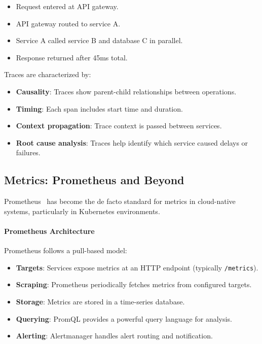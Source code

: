 \begin{itemize}
    \item Request entered at API gateway.
    \item API gateway routed to service A.
    \item Service A called service B and database C in parallel.
    \item Response returned after 45ms total.
\end{itemize}

Traces are characterized by:
\begin{itemize}
    \item \textbf{Causality}: Traces show parent-child relationships between operations.
    \item \textbf{Timing}: Each span includes start time and duration.
    \item \textbf{Context propagation}: Trace context is passed between services.
    \item \textbf{Root cause analysis}: Traces help identify which service caused delays or failures.
\end{itemize}

\subsection{Metrics: Prometheus and Beyond}

Prometheus~%
has become the de facto standard for metrics in cloud-native systems, particularly in Kubernetes environments.

\paragraph{Prometheus Architecture}

Prometheus follows a pull-based model:
\begin{itemize}
    \item \textbf{Targets}: Services expose metrics at an HTTP endpoint (typically \texttt{/metrics}).
    \item \textbf{Scraping}: Prometheus periodically fetches metrics from configured targets.
    \item \textbf{Storage}: Metrics are stored in a time-series database.
    \item \textbf{Querying}: PromQL provides a powerful query language for analysis.
    \item \textbf{Alerting}: Alertmanager handles alert routing and notification.
\end{itemize}

